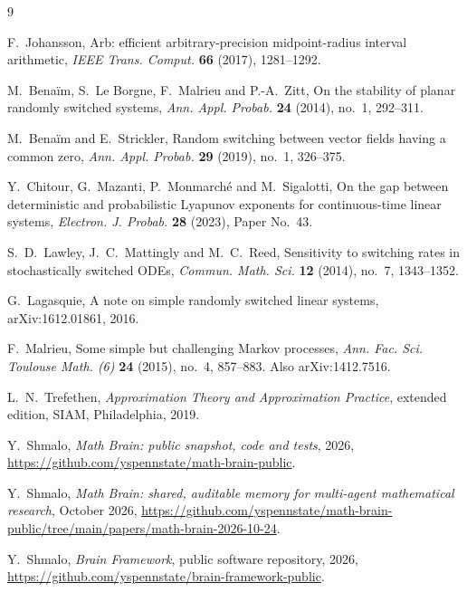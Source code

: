 \documentclass[11pt]{amsart}
\theoremstyle{remark}
\numberwithin{equation}{section}
\begin{document}
\begin{thebibliography}{9}

F.~Johansson, Arb: efficient arbitrary-precision midpoint-radius interval arithmetic, \emph{IEEE Trans. Comput.} \textbf{66} (2017), 1281--1292.

M.~Bena\"im, S.~Le Borgne, F.~Malrieu and P.-A.~Zitt, On the stability of planar randomly switched systems, \emph{Ann. Appl. Probab.} \textbf{24} (2014), no.~1, 292--311.

M.~Bena\"im and E.~Strickler, Random switching between vector fields having a common zero, \emph{Ann. Appl. Probab.} \textbf{29} (2019), no.~1, 326--375.

Y.~Chitour, G.~Mazanti, P.~Monmarch\'e and M.~Sigalotti, On the gap between deterministic and probabilistic Lyapunov exponents for continuous-time linear systems, \emph{Electron. J. Probab.} \textbf{28} (2023), Paper No.~43.

S.~D.~Lawley, J.~C.~Mattingly and M.~C.~Reed, Sensitivity to switching rates in stochastically switched ODEs, \emph{Commun. Math. Sci.} \textbf{12} (2014), no.~7, 1343--1352.

G.~Lagasquie, A note on simple randomly switched linear systems, arXiv:1612.01861, 2016.

F.~Malrieu, Some simple but challenging Markov processes, \emph{Ann. Fac. Sci. Toulouse Math. (6)} \textbf{24} (2015), no.~4, 857--883. Also arXiv:1412.7516.

L.~N.~Trefethen, \emph{Approximation Theory and Approximation Practice}, extended edition, SIAM, Philadelphia, 2019.

 Y.~Shmalo, \emph{Math Brain: public snapshot, code and tests}, 2026, \url{https://github.com/yspennstate/math-brain-public}.

 Y.~Shmalo, \emph{Math Brain: shared, auditable memory for multi-agent mathematical research}, October 2026, \url{https://github.com/yspennstate/math-brain-public/tree/main/papers/math-brain-2026-10-24}.

 Y.~Shmalo, \emph{Brain Framework}, public software repository, 2026, \url{https://github.com/yspennstate/brain-framework-public}.

\end{thebibliography}
\end{document}
